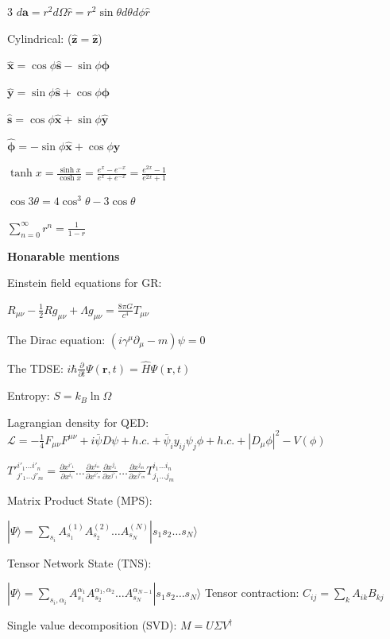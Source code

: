 \documentclass[a4paper,twoside]{article}
\newcommand{\secblock}[1]{%
\par\vspace{1.8pt}%
\noindent\colorbox{hdrcol}{\parbox[c][1.0em][c]{0.98\linewidth}{\color{white}\bfseries\small #1}}\par
\vspace{1pt}%
}
\begin{document}
\begin{multicols*}{3}
\(d \bm a = r^2 d \Omega \hat{r} = r^2 \sin \theta d\theta d\phi \hat{r}\)

Cylindrical: (\(\hat{\bm z} = \hat{\bm z}\))

\(\hat{\bm x} = \cos \phi \hat{\bm s} - \sin \phi \hat{\bm \phi}\)

\(\hat{\bm y} = \sin \phi \hat{\bm s} + \cos \phi \hat{\bm \phi}\)



\(\hat{\bm s} = \cos \phi \hat{\bm x} + \sin \phi \hat{\bm y}\)

\(\hat{\bm \phi} = -\sin \phi \hat{\bm x} + \cos \phi \hat{\bm y}\)


\(\tanh x = \frac{\sinh x}{\cosh x} = \frac{e^x - e^{-x}}{e^x + e^{-x}} = \frac{e^{2x} -1}{e^{2x} + 1}\)

\(\cos 3 \theta = 4 \cos^3 \theta - 3 \cos \theta\)


\(\sum_{n=0}^{\infty} r^n = \frac{1}{1-r}\)


\secblock{Honarable mentions}

Einstein field equations for GR:

\(R_{\mu\nu} - \frac{1}{2}R g_{\mu\nu} + \Lambda g_{\mu\nu} = \frac{8\pi G}{c^4} T_{\mu\nu}\)

The Dirac equation:
\((i\gamma^\mu \partial_\mu - m)\psi = 0\)

The TDSE:
\(i\hbar \frac{\partial}{\partial t} \Psi(\mathbf{r}, t) = \hat{H} \Psi(\mathbf{r}, t)\)

Entropy:
\(S = k_B \ln \Omega\)

Lagrangian density for QED:
\(\mathcal{L} = -\frac{1}{4}F_{\mu\nu}F^{\mu\nu} + i\bar{\psi}D\psi + h.c. + \bar{\psi}_i y_{ij} \psi_j \phi + h.c. + |D_\mu \phi|^2 - V(\phi)\)


\(T'^{i'_1 \dots i'_n}_{j'_1 \dots j'_m} = \frac{\partial x^{i'_1}}{\partial x^{i_1}} \dots \frac{\partial x^{i_n}}{\partial x^{i'_n}} \frac{\partial x^{j_1}}{\partial x^{j'_1}} \dots \frac{\partial x^{j_m}}{\partial x^{j'_m}} T^{i_1 \dots i_n}_{j_1 \dots j_m}\)

Matrix Product State (MPS):

\(|\Psi\rangle = \sum_{s_i} A^{(1)}_{s_1} A^{(2)}_{s_2} \dots A^{(N)}_{s_N} |s_1 s_2 \dots s_N\rangle\)

Tensor Network State (TNS):

\(|\Psi\rangle = \sum_{s_i,\alpha_i} A_{s_1}^{\alpha_1} A^{ \alpha_1, \alpha_2}_{s_2} \dots A^{\alpha_{N-1}}_{s_N} |s_1 s_2 \dots s_N\rangle\) 
Tensor contraction:
\(C_{ij} = \sum_{k} A_{ik} B_{kj}\)

Single value decomposition (SVD): \(M = U \Sigma V^\dagger\)

\end{multicols*}
\end{document}
